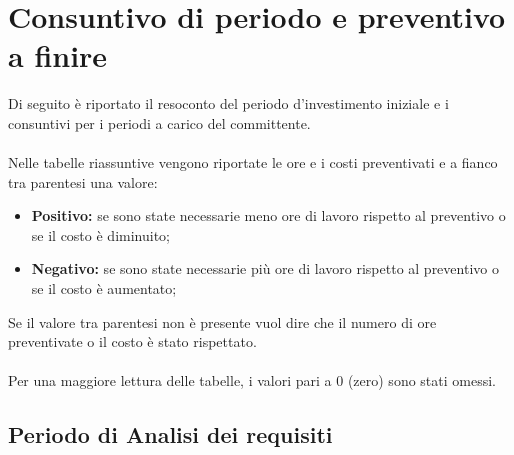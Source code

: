 \documentclass[PianoDiProgetto.tex]{subfiles}
\begin{document}
\chapter{Consuntivo di periodo e preventivo a finire}
Di seguito è riportato il resoconto del periodo d'investimento iniziale e i consuntivi per i periodi a carico del committente.\\\\
Nelle tabelle riassuntive vengono riportate le ore e i costi preventivati e a fianco tra parentesi una valore: 
\begin{itemize}
	\item \textbf{Positivo:} se sono state necessarie meno ore di lavoro rispetto al preventivo o se il costo è diminuito;
	\item \textbf{Negativo:} se sono state necessarie più ore di lavoro rispetto al preventivo o se il costo è aumentato;
\end{itemize}
Se il valore tra parentesi non è presente vuol dire che il numero di ore preventivate o il costo è stato rispettato.\\\\
Per una maggiore lettura delle tabelle, i valori pari a 0 (zero) sono stati omessi.

\newpage
\section{Periodo di Analisi dei requisiti}
\end{document}
